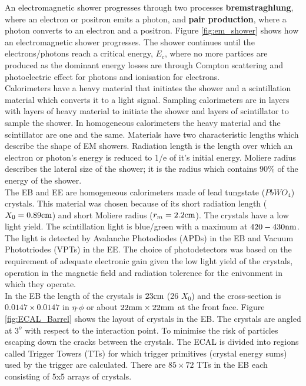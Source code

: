 An electromagnetic shower progresses through two processes {\bf bremstraghlung},
where an electron or positron emits a photon, and {\bf pair production}, where a
photon converts to an electron and a positron. Figure \ref{fig:em_shower} shows
how an electromagnetic shower progresses. The shower continues until the
electrons/photons reach a critical energy, $E_{c}$, where no more partices are 
produced as the dominant energy losses are through Compton scattering and
photoelectric effect for photons and ionisation for electrons. \\

Calorimeters have a heavy material that initiates the shower and a scintillation
material which converts it to a light signal. Sampling calorimeters are in
layers with layers of heavy material to initiate the shower and layers of
scintillator to sample the shower. In homogeneous calorimeters the heavy
material and the scintillator are one and the same. Materials have two
characteristic lengths which describe the shape of EM showers. Radiation length
is the length over which an electron or photon's energy is reduced to 1/e of
it's initial energy. Moliere radius describes the lateral size of the shower; it
is the radius which contains 90\% of the energy of the shower. \\  

The EB and EE are homogeneous calorimeters made of lead tungstate ($PbWO_{4}$)
crystals. This material was chosen because of its short radiation length ($X_{0}
= 0.89\mbox{cm}$) and short Moliere radius ($r_{m} = 2.2\mbox{cm}$). The crystals have a low
light yield. The scintillation light is blue/green with a maximum at 
$420-430\mbox{nm}$. The light is detected by Avalanche Photodiodes (APDs) in the EB 
and Vacuum Phototriodes (VPTs) in the EE. The choice of photodetectors was based
on the requirement of adequate electronic gain given the low light yield of the 
crystals, operation in the magnetic field and radiation tolerence for the 
enivonment in which they operate. \\

In the EB the length of the crystals is $23\mbox{cm}$ (26 $X_{0}$) and the 
cross-section is $0.0147\times0.0147$ in $\eta$-$\phi$ or about 
$22\mbox{mm}\times22\mbox{mm}$ at the front face. Figure \ref{fig:ECAL_Barrel} shows the
layout of crystals in the EB. The crystals are angled at $3^{o}$ with
respect to the interaction point. To minimise the risk of particles escaping 
down the cracks between the crystals. The ECAL is divided into regions called 
Trigger Towers (TTs) for which trigger primitives (crystal energy sums) used by 
the trigger are calculated. There are $85\times72$ TTs in the EB each consisting
of 5x5 arrays of crystals. \\

